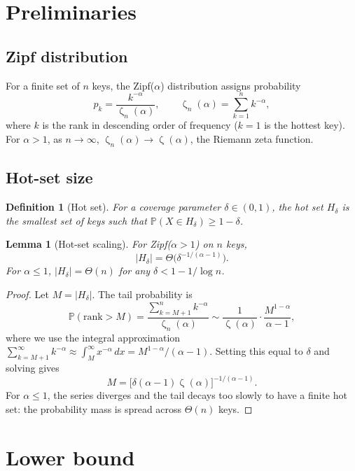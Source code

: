 \documentclass[11pt]{article}
\newtheorem{lemma}[theorem]{Lemma}
\newtheorem{definition}[theorem]{Definition}
\newcommand{\Prob}{\mathbb{P}}
\DeclareMathOperator{\Zeta}{\zeta}
\begin{document}
\section{Preliminaries}

\subsection{Zipf distribution}

For a finite set of $n$ keys, the Zipf($\alpha$) distribution assigns
probability
\[
p_k = \frac{k^{-\alpha}}{\Zeta_n(\alpha)},\qquad
\Zeta_n(\alpha) = \sum_{k=1}^n k^{-\alpha},
\]
where $k$ is the rank in descending order of frequency ($k=1$ is the hottest
key).  For $\alpha>1$, as $n\to\infty$, $\Zeta_n(\alpha) \to \Zeta(\alpha)$,
the Riemann zeta function.

\subsection{Hot-set size}

\begin{definition}[Hot set]
For a coverage parameter $δ\in(0,1)$, the hot set $H_δ$ is the smallest set of
keys such that $\Prob(X\in H_δ) \ge 1-δ$.
\end{definition}

\begin{lemma}[Hot-set scaling]
\label{lem:hot}
For Zipf($\alpha>1$) on $n$ keys,
\[
|H_δ| = \Theta\bigl(δ^{-1/(\alpha-1)}\bigr).
\]
For $\alpha\le1$, $|H_δ| = \Theta(n)$ for any $δ<1-1/\log n$.
\end{lemma}

\begin{proof}
Let $M = |H_δ|$.  The tail probability is
\[
\Prob(\text{rank} > M) = \frac{\sum_{k=M+1}^n k^{-\alpha}}{\Zeta_n(\alpha)}
\sim \frac{1}{\Zeta(\alpha)}\cdot\frac{M^{1-\alpha}}{\alpha-1},
\]
where we use the integral approximation $\sum_{k=M+1}^\infty k^{-\alpha}
\approx \int_M^\infty x^{-\alpha}\,dx = M^{1-\alpha}/(\alpha-1)$.
Setting this equal to $δ$ and solving gives
\[
M = \bigl[δ(\alpha-1)\Zeta(\alpha)\bigr]^{-1/(\alpha-1)}.
\]
For $\alpha\le1$, the series diverges and the tail decays too slowly to
have a finite hot set: the probability mass is spread across $\Theta(n)$ keys.
\end{proof}

\section{Lower bound}
\end{document}
